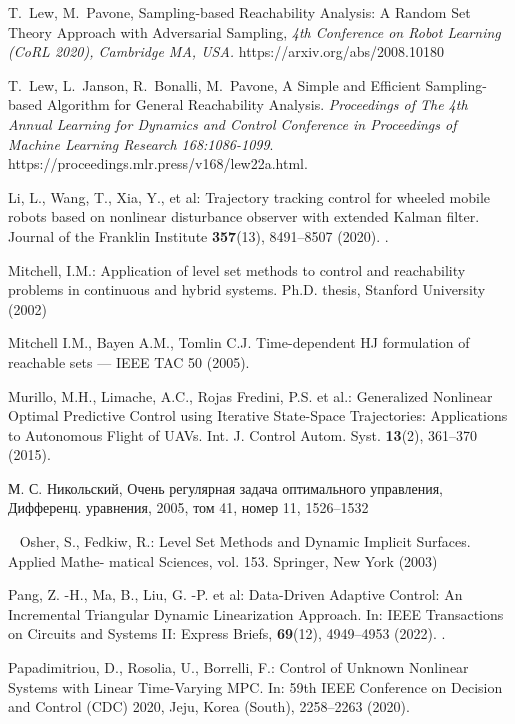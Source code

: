 \documentclass[../main.tex]{subfiles}
\begin{document}
\begin{thebibliography}{99}
T.~Lew, M.~Pavone, Sampling-based Reachability Analysis: A Random Set Theory Approach with Adversarial Sampling, {\it 4th Conference on Robot Learning (CoRL 2020), Cambridge MA, USA.} https://arxiv.org/abs/2008.10180 

T.~Lew, L.~Janson, R.~Bonalli, M.~Pavone,  A Simple and Efficient Sampling-based Algorithm for General Reachability Analysis. {\it Proceedings of The 4th Annual Learning for Dynamics and Control Conference in Proceedings of Machine Learning Research
	168:1086-1099}. https://proceedings.mlr.press/v168/lew22a.html.

Li, L., Wang, T., Xia, Y., et al:  Trajectory tracking control for wheeled mobile robots based on nonlinear disturbance observer with extended Kalman filter. Journal of the Franklin Institute \textbf{357}(13), 8491--8507 (2020). .

Mitchell, I.M.: Application of level set methods to control and reachability problems in
continuous and hybrid systems. Ph.D. thesis, Stanford University (2002)

Mitchell I.M., Bayen A.M., Tomlin C.J. Time-dependent HJ formulation of reachable sets — IEEE TAC 50 (2005).

Murillo, M.H., Limache, A.C., Rojas Fredini, P.S. et al.: Generalized Nonlinear Optimal Predictive Control using Iterative State-Space
Trajectories: Applications to Autonomous Flight of UAVs. Int. J. Control Autom. Syst. \textbf{13}(2), 361--370 (2015).


М. С. Никольский, Очень регулярная задача оптимального управления, Дифференц. уравнения, 2005, том 41, номер 11, 1526–1532

Osher, S., Fedkiw, R.: Level Set Methods and Dynamic Implicit Surfaces. Applied Mathe-
matical Sciences, vol. 153. Springer, New York (2003)

Pang, Z. -H., Ma, B., Liu, G. -P.  et al: Data-Driven Adaptive Control: An Incremental Triangular Dynamic Linearization Approach. In: IEEE Transactions on Circuits and Systems II: Express Briefs, \textbf{69}(12), 4949--4953 (2022). .

Papadimitriou, D., Rosolia, U., Borrelli, F.: Control of Unknown Nonlinear Systems with Linear Time-Varying MPC. In: 59th IEEE Conference on Decision and Control (CDC) 2020, Jeju, Korea (South), 2258--2263 (2020). 


\end{thebibliography}
\end{document}
